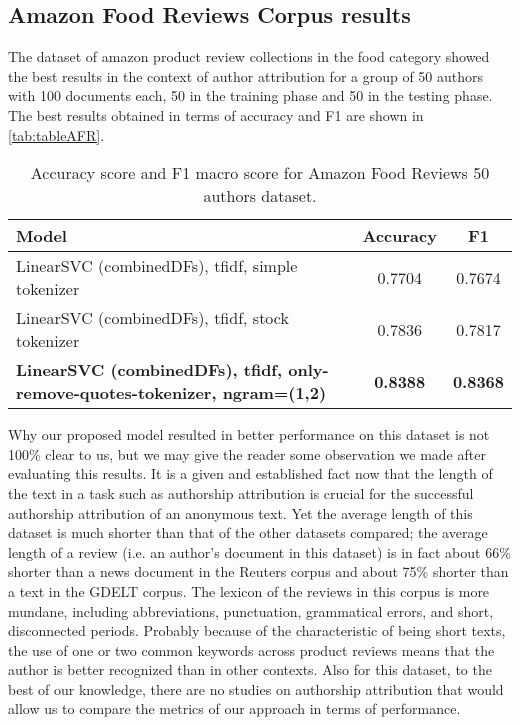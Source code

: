 \subsection{Amazon Food Reviews Corpus results}
The dataset of amazon product review collections in the food category showed the best results in the context of author attribution for a group of 50 authors with 100 documents each, 50 in the training phase and 50 in the testing phase. The best results obtained in terms of accuracy and F1 are shown in \autoref{tab:tableAFR}.

\begin{table}[h!]
	\begin{center}  
		\caption[Amazon Food Reviews Results - 50 authors]{Accuracy score and F1 macro score for Amazon Food Reviews 50 authors dataset.} 
		\label{tab:tableAFR}
		\begin{tabular}{| p{5 cm} | c | c |}
			\hline 
			Model & Accuracy & F1 \\
			\hline
			LinearSVC (combinedDFs), tfidf, simple tokenizer & 0.7704 & 0.7674 \\ \hline
			LinearSVC (combinedDFs), tfidf, stock tokenizer & 0.7836 & 0.7817 \\ \hline
			\textbf{LinearSVC (combinedDFs), tfidf, only-remove-quotes-tokenizer,
				ngram=(1,2)} & \textbf{0.8388} & \textbf{0.8368} \\ \hline
		\end{tabular} 
	\end{center}
\end{table}

Why our proposed model resulted in better performance on this dataset is not 100\% clear to us, but we may give the reader some observation we made after evaluating this results. It is a given and established fact now that the length of the text in a task such as authorship attribution is crucial for the successful authorship attribution of an anonymous text. Yet the average length of this dataset is much shorter than that of the other datasets compared; the average length of a review (i.e. an author's document in this dataset) is in fact about 66\% shorter than a news document in the Reuters corpus and about 75\% shorter than a text in the GDELT corpus. The lexicon of the reviews in this corpus is more mundane, including abbreviations, punctuation, grammatical errors, and short, disconnected periods. Probably because of the characteristic of being short texts, the use of one or two common keywords across product reviews means that the author is better recognized than in other contexts.
Also for this dataset, to the best of our knowledge, there are no studies on authorship attribution that would allow us to compare the metrics of our approach in terms of performance.

